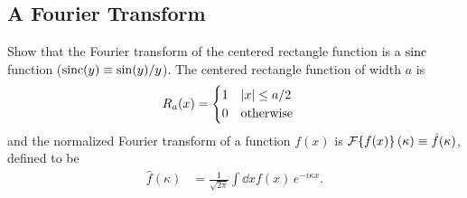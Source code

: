 \documentclass[]{manual}
\begin{document}
    \subsection*{A Fourier Transform}

    Show that the Fourier transform of the centered rectangle function is a $\operatorname{sinc}$ function ($\operatorname{sinc}(y) \equiv \sin(y)/y$).
    The centered rectangle function of width $a$ is
    \begin{align*}
        R_a(x) &= \begin{cases}
            1 & \abs{x} \leq a/2 \\
            0 & \mathrm{otherwise}
        \end{cases}
    \end{align*}
    and the normalized Fourier transform of a function $f(x)$ is $\mathcal{F}\qty{f(x)}(\kappa) \equiv \hat{f}(\kappa)$, defined to be
    \begin{align*}
        \hat{f}(\kappa) &= \frac{1}{\sqrt{2\pi}} \int \dd{x} f(x) \, e^{-i \kappa x}.
    \end{align*}
\end{document}

